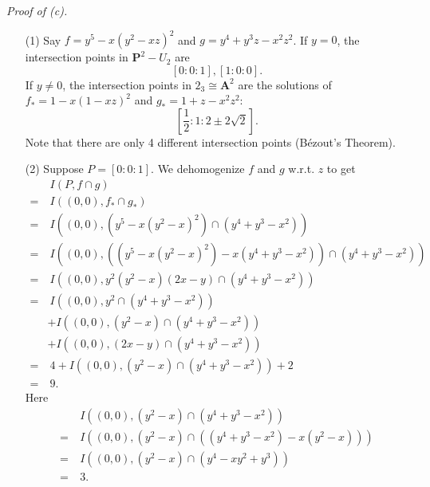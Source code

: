 \documentclass{article}
\begin{document}
\emph{Proof of (c).}
\begin{enumerate}
\item[(1)]
  Say $f = y^5 - x(y^2-xz)^2$ and $g = y^4 + y^3z - x^2z^2$.
  If $y = 0$, the intersection points in $\mathbf{P}^{2} - U_2$ are
  \[
    [0:0:1], [1:0:0].
  \]
  If $y \neq 0$, the intersection points in $2_3 \cong \mathbf{A}^2$ are
  the solutions of $f_{*} = 1 - x(1-xz)^2$ and $g_{*} = 1 + z - x^2z^2$:
  \[
    \left[ \frac{1}{2}:1:2 \pm 2\sqrt{2} \right].
  \]
  Note that there are only 4 different intersection points (B\'ezout's Theorem).

\item[(2)]
  Suppose $P = [0:0:1]$.
  We dehomogenize $f$ and $g$ w.r.t. $z$ to get
  \begin{align*}
    & \:I(P, f \cap g) \\
    =& \: I((0,0), f_{*} \cap g_{*}) \\
    =& \: I((0,0), (y^5 - x(y^2-x)^2) \cap (y^4 + y^3 - x^2)) \\
    =& \: I((0,0), ((y^5 - x(y^2-x)^2) - x(y^4 + y^3 - x^2)) \cap (y^4 + y^3 - x^2)) \\
    =& \: I((0,0), y^2(y^2-x)(2x-y) \cap (y^4 + y^3 - x^2)) \\
    =& \: I((0,0), y^2 \cap (y^4 + y^3 - x^2)) \\
      & + I((0,0), (y^2-x) \cap (y^4 + y^3 - x^2)) \\
      & + I((0,0), (2x-y) \cap (y^4 + y^3 - x^2)) \\
    =& \: 4 + I((0,0), (y^2-x) \cap (y^4 + y^3 - x^2)) + 2 \\
    =& \: 9.
  \end{align*}
  Here
  \begin{align*}
    & \: I((0,0), (y^2-x) \cap (y^4 + y^3 - x^2)) \\
    =& \: I((0,0), (y^2-x) \cap ((y^4 + y^3 - x^2) - x(y^2-x))) \\
    =& \: I((0,0), (y^2-x) \cap (y^4 -xy^2+y^3)) \\
    =& \: 3.
  \end{align*}


\end{enumerate}
\end{document}
